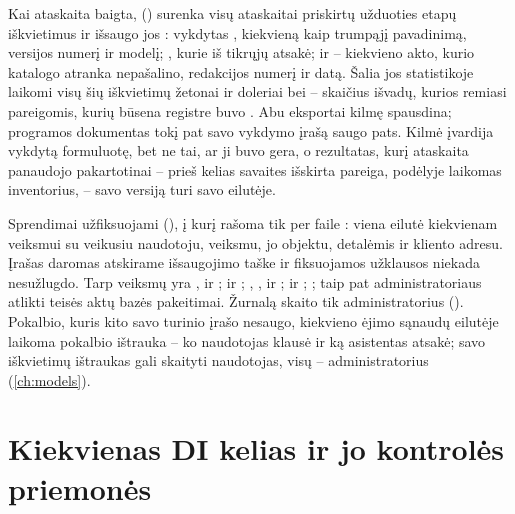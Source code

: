 Kai ataskaita baigta,  () surenka visų
ataskaitai priskirtų užduoties etapų iškvietimus ir išsaugo jos : vykdytas
, kiekvieną kaip trumpąjį pavadinimą, versijos numerį ir modelį; ,
kurie iš tikrųjų atsakė; ir  -- kiekvieno akto, kurio katalogo atranka
nepašalino, redakcijos numerį ir datą. Šalia jos statistikoje laikomi visų šių iškvietimų
žetonai ir doleriai bei  -- skaičius išvadų, kurios remiasi
pareigomis, kurių būsena registre buvo . Abu eksportai kilmę spausdina;
programos dokumentas tokį pat savo vykdymo įrašą saugo pats. Kilmė įvardija vykdytą
formuluotę, bet ne tai, ar ji buvo gera, o rezultatas, kurį ataskaita panaudojo pakartotinai
-- prieš kelias savaites išskirta pareiga, podėlyje laikomas inventorius, -- savo versiją
turi savo eilutėje.

Sprendimai užfiksuojami  (), į kurį rašoma tik per
 faile : viena eilutė kiekvienam veiksmui su veikusiu
naudotoju, veiksmu, jo objektu, detalėmis ir kliento adresu. Įrašas daromas atskirame
išsaugojimo taške ir fiksuojamos užklausos niekada nesužlugdo. Tarp veiksmų yra
,  ir ;
 ir ; ,
,  ir ;
 ir ; ; taip pat
administratoriaus atlikti teisės aktų bazės pakeitimai. Žurnalą skaito tik administratorius
(). Pokalbio, kuris kito savo turinio įrašo nesaugo, kiekvieno ėjimo
sąnaudų eilutėje laikoma pokalbio ištrauka -- ko naudotojas klausė ir ką asistentas atsakė;
savo iškvietimų ištraukas gali skaityti naudotojas, visų -- administratorius
(\cref{ch:models}).


\section{Kiekvienas DI kelias ir jo kontrolės priemonės}\label{sec:control:matrix}

